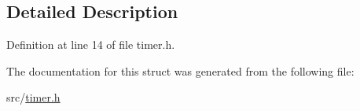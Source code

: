 \subsection{Detailed Description}


Definition at line 14 of file timer.\+h.



The documentation for this struct was generated from the following file\+:\begin{DoxyCompactItemize}
\item 
src/\hyperlink{timer_8h}{timer.\+h}\end{DoxyCompactItemize}
